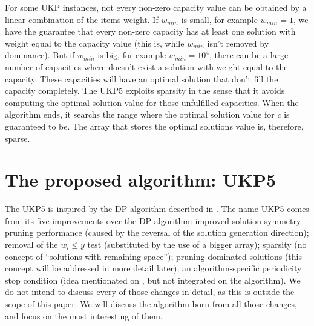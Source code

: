 \documentclass[runningheads,a4paper]{llncs}
\begin{document}
For some UKP instances, not every non-zero capacity value can be obtained by a linear combination of the items weight. If \(w_{min}\) is small, for example \(w_{min} = 1\), we have the guarantee that every non-zero capacity has at least one solution with weight equal to the capacity value (this is, while \(w_{min}\) isn't removed by dominance). But if \(w_{min}\) is big, for example \(w_{min} = 10^4\), there can be a large number of capacities where doesn't exist a solution with weight equal to the capacity. These capacities will have an optimal solution that don't fill the capacity completely. The UKP5 exploits sparsity in the sense that it avoids computing the optimal solution value for those unfulfilled capacities. When the algorithm ends, it searchs the range where the optimal solution value for \(c\) is guaranteed to be. The array that stores the optimal solutions value is, therefore, sparse.

\section{The proposed algorithm: UKP5}

The UKP5 is inspired by the DP algorithm described in \cite[p. 221]{CGAR}. The name UKP5 comes from its five improvements over the \cite{CGAR} DP algorithm: improved solution symmetry pruning performance (caused by the reversal of the solution generation direction); removal of the \(w_i \leq y\) test (substituted by the use of a bigger array); sparsity (no concept of ``solutions with remaining space''); pruning dominated solutions (this concept will be addressed in more detail later); an algorithm-specific periodicity stop condition (idea mentionated on \cite{CGAR}, but not integrated on the algorithm). We do not intend to discuss every of those changes in detail, as this is outside the scope of this paper. We will discuss the algorithm born from all those changes, and focus on the most interesting of them.
\end{document}
